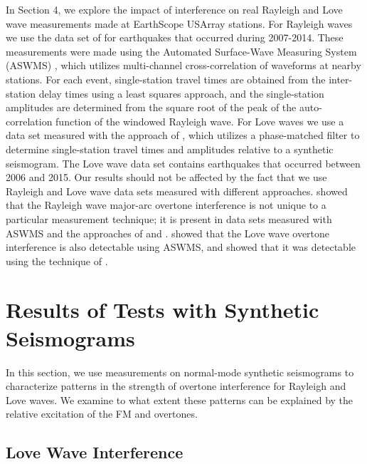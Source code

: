 \documentclass[extra,mreferee]{gji}
\begin{document}
In Section 4, we explore the impact of interference on real Rayleigh and Love wave measurements made at EarthScope USArray stations. 
For Rayleigh waves we use the data set of \citet{babikoff2019long} for earthquakes that occurred during 2007-2014. These measurements were made using the Automated Surface-Wave Measuring System (ASWMS) \citep{jingmcc}, which utilizes multi-channel cross-correlation of waveforms at nearby stations. For each event, single-station travel times are obtained from the inter-station delay times using a least squares approach, and the single-station amplitudes are determined from the square root of the peak of the auto-correlation function of the windowed Rayleigh wave. For Love waves we use a data set measured with the approach of \citet{ekstrom1997measurements}, which utilizes a phase-matched filter to determine single-station travel times and amplitudes relative to a synthetic seismogram. The Love wave data set contains earthquakes that occurred between 2006 and 2015. Our results should not be affected by the fact that we use Rayleigh and Love wave data sets measured with different approaches.  \citet{hariharan2020evidence} showed that the Rayleigh wave major-arc overtone interference is not unique to a particular measurement technique; it is present in data sets measured with ASWMS and the approaches of \citet{ekstrom1997measurements} and \citet{ma2014comprehensive}. \citet{jingmcc} showed that the Love wave overtone interference is also detectable using ASWMS, and \citet{foster2014overtone} showed that it was detectable using the technique of \citet{ekstrom1997measurements}.

\section{Results of Tests with Synthetic Seismograms}

In this section, we use measurements on normal-mode synthetic seismograms to characterize patterns in the strength of overtone interference for Rayleigh and Love waves. We examine to what extent these patterns can be explained by the relative excitation of the FM and overtones. 
\subsection{Love Wave Interference}
 
\end{document}
